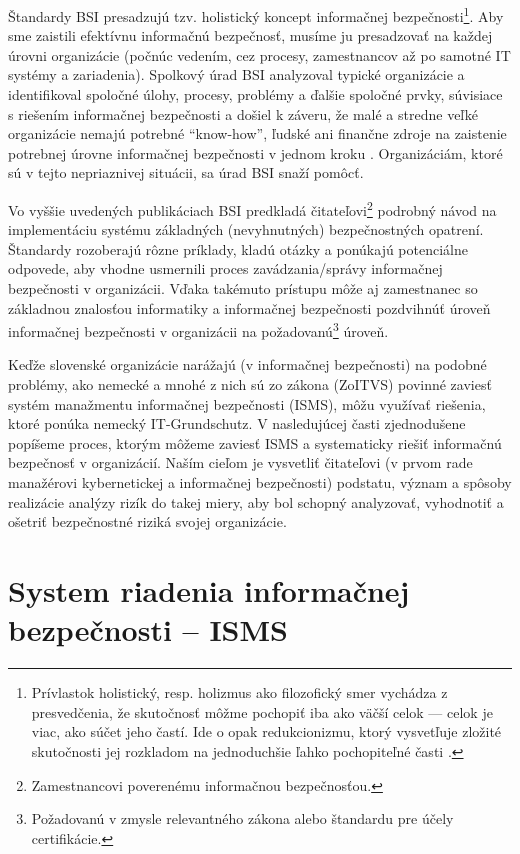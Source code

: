 Štandardy BSI presadzujú tzv. holistický koncept informačnej bezpečnosti\footnote{Prívlastok holistický, resp.
holizmus ako filozofický smer vychádza z presvedčenia, že skutočnosť môžme pochopiť iba ako väčší celok --- celok
je viac, ako súčet jeho častí. Ide o opak redukcionizmu, ktorý vysvetľuje zložité skutočnosti jej rozkladom na 
jednoduchšie ľahko pochopiteľné časti \cite{WikiHolism}.}. Aby sme zaistili efektívnu informačnú bezpečnosť, musíme ju
presadzovať na každej úrovni organizácie (počnúc vedením, cez procesy, zamestnancov až po samotné IT systémy a zariadenia).
Spolkový úrad BSI analyzoval typické organizácie a identifikoval spoločné úlohy, procesy, problémy a ďalšie
spoločné prvky, súvisiace s riešením informačnej bezpečnosti a došiel k záveru, že malé a stredne veľké organizácie
nemajú potrebné \enquote{know-how}, ľudské ani finančne zdroje na zaistenie potrebnej úrovne informačnej bezpečnosti v
jednom kroku \cite{BSI1}. Organizáciám, ktoré sú v tejto nepriaznivej situácii, sa úrad BSI snaží pomôcť. 

Vo vyššie uvedených publikáciach BSI predkladá čitateľovi\footnote{Zamestnancovi poverenému informačnou bezpečnosťou.} 
podrobný návod na implementáciu systému základných (nevyhnutných) bezpečnostných opatrení. Štandardy rozoberajú rôzne
príklady, kladú otázky a ponúkajú potenciálne odpovede, aby vhodne usmernili proces zavádzania/správy informačnej
bezpečnosti v organizácii. Vďaka takémuto prístupu môže aj zamestnanec so základnou znalosťou informatiky a informačnej
bezpečnosti pozdvihnúť úroveň informačnej bezpečnosti v organizácii na požadovanú\footnote{Požadovanú v zmysle relevantného
zákona alebo štandardu pre účely certifikácie.} úroveň. 

Keďže slovenské organizácie narážajú (v informačnej bezpečnosti) na podobné problémy, ako nemecké a mnohé z nich sú zo
zákona (ZoITVS) povinné zaviesť systém manažmentu informačnej bezpečnosti (ISMS), môžu využívať riešenia, ktoré ponúka
nemecký IT-Grundschutz. V nasledujúcej časti zjednodušene popíšeme proces, ktorým môžeme zaviesť ISMS a systematicky 
riešiť informačnú bezpečnosť v organizácií. Naším cieľom je vysvetliť čitateľovi (v prvom rade manažérovi kybernetickej
a informačnej bezpečnosti) podstatu, význam a spôsoby realizácie analýzy rizík do takej miery, aby bol schopný analyzovať,
vyhodnotiť a ošetriť bezpečnostné riziká svojej organizácie.

\section{System riadenia informačnej bezpečnosti -- ISMS}
\label{sec:isms}

